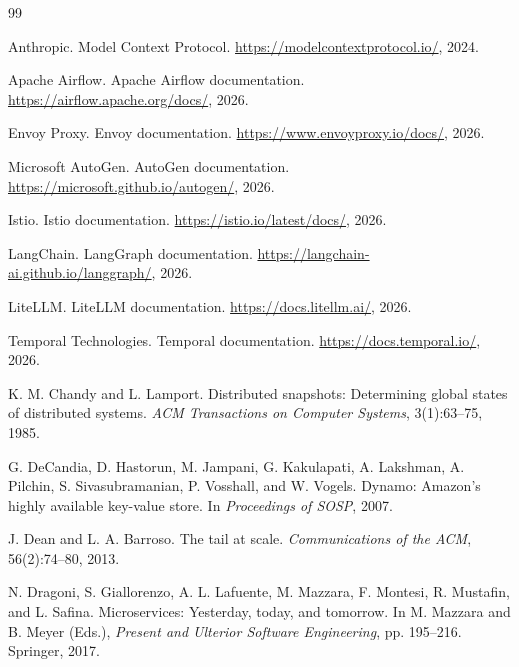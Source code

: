\documentclass[5p,times]{elsarticle}
\begin{document}
\begin{thebibliography}{99}

Anthropic.
\newblock Model Context Protocol.
\newblock \url{https://modelcontextprotocol.io/}, 2024.

Apache Airflow.
\newblock Apache Airflow documentation.
\newblock \url{https://airflow.apache.org/docs/}, 2026.

Envoy Proxy.
\newblock Envoy documentation.
\newblock \url{https://www.envoyproxy.io/docs/}, 2026.

Microsoft AutoGen.
\newblock AutoGen documentation.
\newblock \url{https://microsoft.github.io/autogen/}, 2026.

Istio.
\newblock Istio documentation.
\newblock \url{https://istio.io/latest/docs/}, 2026.

LangChain.
\newblock LangGraph documentation.
\newblock \url{https://langchain-ai.github.io/langgraph/}, 2026.

LiteLLM.
\newblock LiteLLM documentation.
\newblock \url{https://docs.litellm.ai/}, 2026.

Temporal Technologies.
\newblock Temporal documentation.
\newblock \url{https://docs.temporal.io/}, 2026.

K. M. Chandy and L. Lamport.
\newblock Distributed snapshots: Determining global states of distributed systems.
\newblock \emph{ACM Transactions on Computer Systems}, 3(1):63--75, 1985.

G. DeCandia, D. Hastorun, M. Jampani, G. Kakulapati, A. Lakshman, A. Pilchin, S. Sivasubramanian, P. Vosshall, and W. Vogels.
\newblock Dynamo: Amazon's highly available key-value store.
\newblock In \emph{Proceedings of SOSP}, 2007.

J. Dean and L. A. Barroso.
\newblock The tail at scale.
\newblock \emph{Communications of the ACM}, 56(2):74--80, 2013.

N. Dragoni, S. Giallorenzo, A. L. Lafuente, M. Mazzara, F. Montesi, R. Mustafin, and L. Safina.
\newblock Microservices: Yesterday, today, and tomorrow.
\newblock In M. Mazzara and B. Meyer (Eds.), \emph{Present and Ulterior Software Engineering}, pp. 195--216. Springer, 2017.


\end{thebibliography}
\end{document}
